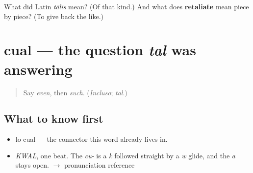 \begin{tcolorbox}[breakable,colback=teal!4,colframe=teal!35!black,title={Before you move on}]
What did Latin \emph{tālis} mean? (Of that kind.) And what does \textbf{retaliate} mean piece by piece? (To give back the like.)
\end{tcolorbox}
\section[cual]{cual — the question \emph{tal} was answering}

\label{lesson:ES-C329-cual}



\begin{quote}
Say \emph{even}, then \emph{such}. (\emph{Incluso}; \emph{tal}.)
\end{quote}

\subsection*{What to know first}
\begin{itemize}
\raggedright
  \item lo cual — the connector this word already lives in.
\end{itemize}

\begin{sounds}
\begin{itemize}
\raggedright
  \item \emph{KWAL}, one beat. The \emph{cu-} is a \emph{k} followed straight by a \emph{w} glide, and the \emph{a} stays open. $\to$ pronunciation reference
\end{itemize}
\end{sounds}

